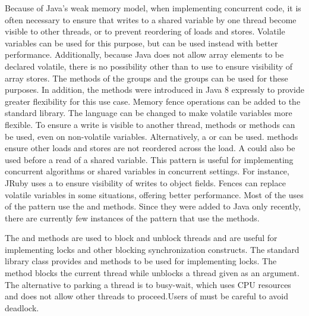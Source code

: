 %
{Because of Java's weak memory
  model, when implementing concurrent code,
  it is often necessary to ensure that
  writes to a shared variable by one thread become visible to other threads,
  or to prevent
  reordering of loads and stores.
  Volatile variables can be used for this purpose, but
  \smu{} can be used instead with better performance.
  Additionally, because Java does not allow array elements to be declared volatile,
  there is no possibility other than to use \unsafe{} to ensure visibility of
  array stores. The methods of the  groups
  and the  groups can be used for these purposes.
  In addition, the  methods were introduced in Java 8 expressly
to provide greater flexibility for this use case.}
{Memory fence operations can be added to the standard library. The language
can be changed to make volatile variables more flexible.}
{To ensure a write is visible to another thread, 
  methods or  methods can be used, even on non-volatile variables.
  Alternatively, a  or  can be used.
   methods ensure other loads and stores are not reordered
  across the load. A  could also be used before a read of a
  shared variable.
}{This pattern is useful for implementing concurrent algorithms or shared
  variables in concurrent settings. For instance, JRuby uses a 
  to ensure visibility of writes to object fields.
}{Fences can replace volatile variables in some situations, offering better
  performance. Most of the uses of the pattern use the 
  and  methods. Since they were added to Java only recently, there are currently few instances
of the pattern that use the  methods.}

\newcommand\foundinpark{62}
\newcommand\usedbypark{7330}
\newcommand\mostusedpark{\parkmost}
\newcommand\memberspark{\member{park}, \member{unpark}}
\newcommand\namepark{Park/Unpark Threads}


%
{The  and  methods are used to block and unblock threads and are useful for implementing locks and other
blocking synchronization constructs.}
{The standard library class  provides  and 
methods to be used for implementing locks.}
{The  method blocks the current thread while 
unblocks a thread given as an argument.}
{The alternative to parking a thread is to busy-wait, which uses CPU
resources and does not allow other threads to proceed.}{Users of
   must be careful to avoid deadlock.}

